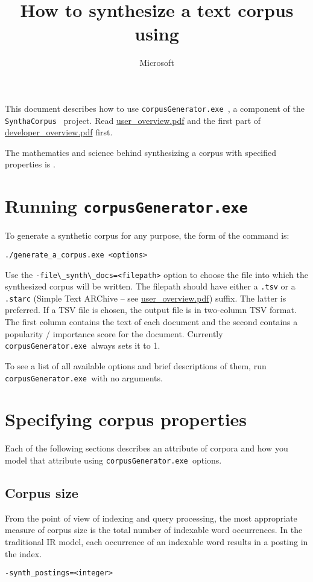 \documentclass{article}
\title{How to synthesize a text corpus using \gac}
\author{Microsoft}
\newcommand{\red}[1]{{\color{red}{\emph{#1}}}}
\newcommand{\gac}{\texttt{corpusGenerator.exe~}}
\newcommand{\projectName}{\texttt{SynthaCorpus}}
\begin{document}
\maketitle{}

This document describes how to use \gac, a component of the
\projectName~ project.  Read \url{user_overview.pdf} and the first
part of \url{developer_overview.pdf} first.


The mathematics and science behind synthesizing a corpus with
specified properties is \red{described
  elsewhere}.


\section{Running \gac}
To generate a synthetic corpus for any purpose, the form of the
command is:
\begin{verbatim}
./generate_a_corpus.exe <options>
\end{verbatim}

Use the \verb|-file\_synth\_docs=<filepath>| option to choose the
file into which the synthesized corpus will be written.  The filepath
should have either a \verb|.tsv| or a \verb|.starc| (Simple Text
ARChive -- see \url{user_overview.pdf}) suffix.  The latter is
preferred. If a TSV file is chosen, the output file is in two-column TSV
format.  The first column contains the text of each document and the
second contains a popularity / importance score for the document.
Currently \gac always sets it to 1.

To see a list of all available options and brief descriptions of them,
run \gac with no arguments.


\section{Specifying corpus properties}
Each of the following sections describes an attribute of corpora and
how you model that attribute using \gac options.

\subsection{Corpus size}
From the point of view of indexing and query processing, the most
appropriate measure of corpus size is the total number of indexable
word occurrences. In the traditional IR model, each occurrence of an
indexable word results in a posting in the index.
\begin{verbatim}
-synth_postings=<integer>
\end{verbatim}
\end{document}
